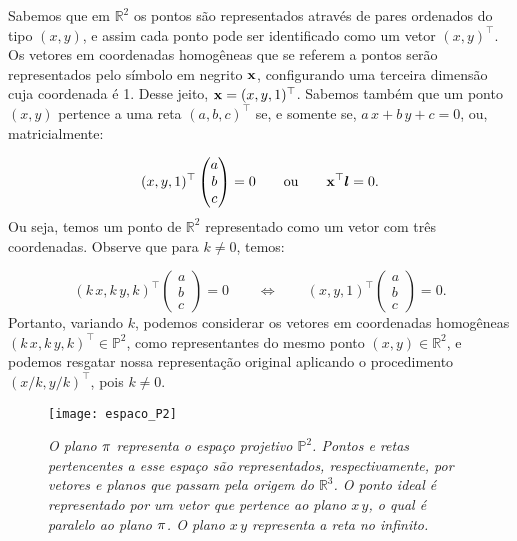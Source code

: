 Sabemos que em $\mathbb{R}^{2}$ os pontos são representados através de pares ordenados do tipo $(x,y)$, e assim cada ponto pode ser identificado como um vetor $(x,y)^\top$. Os vetores em coordenadas homogêneas que se referem a pontos serão representados pelo símbolo em negrito $\mathbf{x}$, configurando uma terceira dimensão cuja coordenada é 1. Desse jeito, $\mathbf{x}=(x,y,1)^\top$. Sabemos também que um ponto $(x,y)$ pertence a uma reta $(a,b,c)^\top$ se, e somente se, $a\,x+b\,y+c=0$, ou, matricialmente:

\begin{equation*}
(x,y,1)^\top 
\begin{pmatrix}
 a  \\ 
 b  \\ 
 c 
 \end{pmatrix} 
 = 0 \qquad 
 \text{ou} 
 \qquad \mathbf{x} ^\top\boldsymbol{l} = 0.
\end{equation*}
Ou seja, temos um ponto de $\mathbb{R}^{2}$ representado como um vetor com três coordenadas. Observe que para $k\neq 0$, temos:

\begin{equation*}
(k\,x,k\,y,k)^\top 
\begin{pmatrix}
 a  \\ 
 b  \\ 
 c 
 \end{pmatrix} 
 = 0
 \qquad \Leftrightarrow \qquad
 (x,y,1)^\top
\begin{pmatrix}
 a  \\ 
 b  \\ 
 c 
 \end{pmatrix} 
 = 0.
\end{equation*}
Portanto,  variando $k$, podemos considerar os vetores em coordenadas homogêneas $(k\,x,k\,y,k)^\top \in \mathbb{P}^2$, como representantes do mesmo ponto $(x,y) \in \mathbb{R}^2$, e podemos resgatar nossa representação original aplicando o procedimento $(x/k,y/k)^\top$, pois $k \ne 0$.

\begin{figure}[!htb]
\centering
\texttt{[image: espaco\_P2]}
\caption{\textit{O plano $\pi$ representa o espaço projetivo $\mathbb{P}^2$. Pontos e retas pertencentes a esse espaço são representados, respectivamente, por vetores e planos que passam pela origem do $\mathbb{R}^3$. O ponto ideal é representado por um vetor que pertence ao plano $x\,y$, o qual é paralelo ao plano $\pi$. O plano $x\,y$ representa a reta no infinito.}}
\label{plano_P2}
\end{figure}


